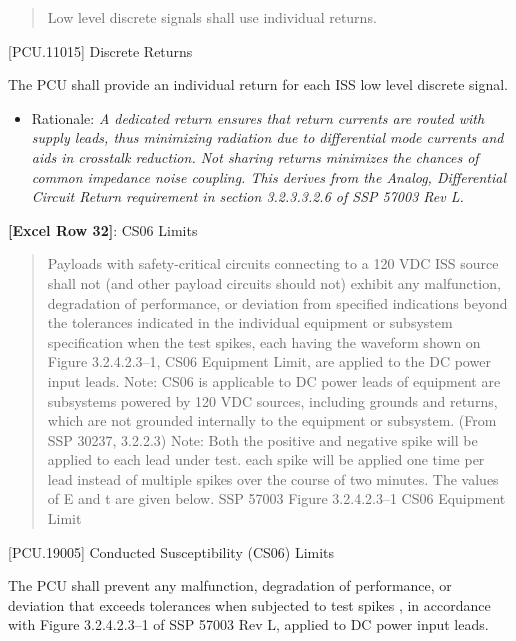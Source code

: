 \begin{quote}
Low level discrete signals shall use individual returns.
\end{quote}

[PCU.11015] Discrete Returns

The PCU shall provide an individual return for each ISS low level discrete signal.

\begin{itemize}
\item{} Rationale: \emph{A dedicated return ensures that return currents are routed with supply leads, thus minimizing radiation due to differential mode currents and aids in crosstalk reduction. Not sharing returns minimizes the chances of common impedance noise coupling. This derives from the Analog, Differential Circuit Return requirement in section 3.2.3.3.2.6 of SSP 57003 Rev L.}

\end{itemize}

\textbf{[Excel Row 32]}: CS06 Limits

\begin{quote}
Payloads with safety-critical circuits connecting to a 120 VDC ISS source shall not (and other payload circuits should not) exhibit any malfunction, degradation of performance, or deviation from specified indications beyond the tolerances indicated in the individual equipment or subsystem specification when the test spikes, each having the waveform shown on Figure 3.2.4.2.3--1, CS06 Equipment Limit, are applied to the DC power input leads.
Note: CS06 is applicable to DC power leads of equipment are subsystems powered by 120 VDC sources, including grounds and returns, which are not grounded internally to the equipment or subsystem. (From SSP 30237, 3.2.2.3)
Note: Both the positive and negative spike will be applied to each lead under test. each spike will be applied one time per lead instead of multiple spikes over the course of two minutes. The values of E and t are given below.
SSP 57003 Figure 3.2.4.2.3--1 CS06 Equipment Limit
\end{quote}

[PCU.19005] Conducted Susceptibility (CS06) Limits

The PCU shall prevent any malfunction, degradation of performance, or deviation that exceeds tolerances when subjected to test spikes , in accordance with Figure 3.2.4.2.3--1 of SSP 57003 Rev L, applied to DC power input leads.

